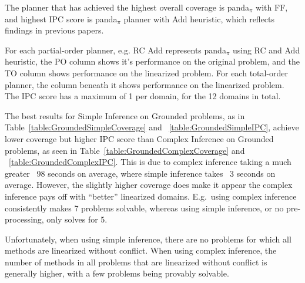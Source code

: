 \documentclass[letterpaper]{article} %
\begin{document}
The planner that has achieved the highest overall coverage is panda$_\pi$ with FF, and highest IPC score is panda$_\pi$ planner with Add heuristic, which reflects findings in previous papers.

For each partial-order planner, e.g. RC Add represents panda$_\pi$ using RC and Add heuristic,
the PO column shows it's performance on the original problem, and the TO column shows performance on the linearized problem. For each total-order planner, the column beneath it shows performance on the linearized problem.
The IPC score has a maximum of 1 per domain, for the 12 domains in total.


The best results for Simple Inference on Grounded problems, as in Table~\ref{table:GroundedSimpleCoverage} and ~\ref{table:GroundedSimpleIPC},
achieve lower coverage but higher IPC score than Complex Inference on Grounded problems, as seen in Table~\ref{table:GroundedComplexCoverage} and ~\ref{table:GroundedComplexIPC}. This is due to complex inference taking a much greater ~98 seconds on average, where simple inference takes ~3 seconds on average. However, the slightly higher coverage does make it appear the complex inference pays off with \enquote{better} linearized domains. E.g.\ using complex inference consistently makes 7 problems solvable, whereas using simple inference, or no pre-processing, only solves for 5.
 
Unfortunately, when using simple inference, there are no problems for which all methods are linearized without conflict.
When using complex inference, the number of methods in all problems that are linearized without conflict is generally higher, with a few problems being provably solvable. 





 
\end{document}
